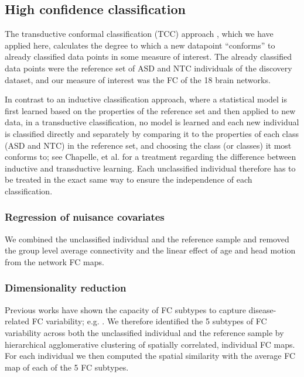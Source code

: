 \documentclass[9pt,lineno]{elife}
\begin{document}
\subsection{High confidence classification}
The transductive conformal classification (TCC) approach \citep{Vovk2005-uc,Nouretdinov2011-ph}, which we have applied here, calculates the degree to which a new datapoint “conforms” to already classified data points in some measure of interest. The already classified data points were the reference set of ASD and NTC individuals of the discovery dataset, and our measure of interest was the FC of the 18 brain networks. 

In contrast to an inductive classification approach, where a statistical model is first learned based on the properties of the reference set and then applied to new data, in a transductive classification, no model is learned and each new individual is classified directly and separately by comparing it to the properties of each class (ASD and NTC) in the reference set, and choosing the class (or classes) it most conforms to; see Chapelle, et al. \citep{Chapelle2006-ex} for a treatment regarding the difference between inductive and transductive learning. Each unclassified individual therefore has to be treated in the exact same way to ensure the independence of each classification.

\subsubsection{Regression of nuisance covariates}
We combined the unclassified individual and the reference sample and removed the group level average connectivity and the linear effect of age and head motion from the network FC maps. 

\subsubsection{Dimensionality reduction}
Previous works have shown the capacity of FC subtypes to capture disease-related FC variability; e.g. \citep{Easson2019-zo}. We therefore identified the 5 subtypes of FC variability across both the unclassified individual and the reference sample by hierarchical agglomerative clustering of spatially correlated, individual FC maps. For each individual we then computed the spatial similarity with the average FC map of each of the 5 FC subtypes.
\end{document}
